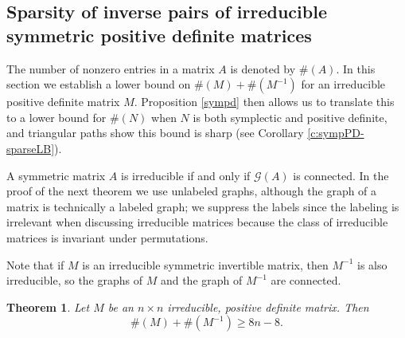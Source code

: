 \documentclass[12pt]{article}
\newtheorem{thm}{Theorem}[section]
\theoremstyle{definition}
\theoremstyle{definition}
\theoremstyle{definition}
\numberwithin{figure}{section}
\numberwithin{equation}{section}
\newcommand{\G}{\mathcal{G}}
\begin{document}
\subsection{Sparsity of inverse pairs of irreducible symmetric positive definite matrices}\label{ss:PDirred-sparse}

 The number of nonzero entries in a matrix $A$
is denoted by $\#(A)$.
 In this section we establish a lower bound on $\#(M)+\#(M^{-1})$ for an irreducible positive definite matrix $M$.  
Proposition \ref{sympd} then allows us to translate this to a lower bound for $\#(N)$ when $N$ is both symplectic and  positive definite, and triangular paths show this bound is sharp (see Corollary \ref{c:sympPD-sparseLB}). 

A symmetric  matrix $A$    is irreducible if and only if $\G(A)$ is connected.
 In the proof of the next theorem we use unlabeled graphs, although the graph of a matrix is technically a labeled graph; we suppress the labels since the labeling is irrelevant when discussing irreducible matrices because the class of irreducible matrices is invariant under permutations. 

 Note that if $M$ is an  irreducible symmetric invertible matrix, then $M^{-1}$ is also irreducible, so the graphs of $M$ and the graph of $M^{-1}$ are connected.
  



\begin{thm}\label{t:PDirred-sparseLB}
Let $M$ be an $n\times n$ irreducible, 
positive definite matrix. 
Then 
\[\#(M)+ \#(M^{-1}) \geq 8n-8.\]
\end{thm}
\end{document}
